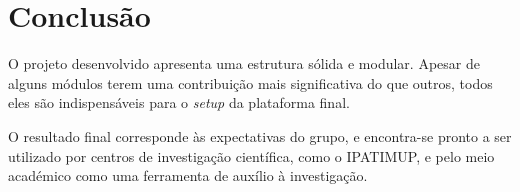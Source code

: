 \section{Conclusão}

O projeto desenvolvido apresenta uma estrutura sólida e modular. Apesar de alguns módulos terem uma contribuição mais significativa do que outros, todos eles são indispensáveis para o \textit{setup} da plataforma final.

O resultado final corresponde às expectativas do grupo, e encontra-se pronto a ser utilizado por centros de investigação científica, como o IPATIMUP, e pelo meio académico como uma ferramenta de auxílio à investigação.

\newpage
